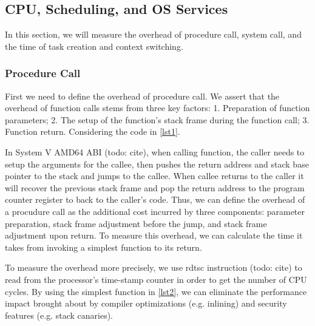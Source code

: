 \subsection{CPU, Scheduling, and OS Services}
In this section, we will measure the overhead of procedure call, system call, and the time of task creation and context switching.

\subsubsection{Procedure Call}
First we need to define the overhead of procedure call. We assert that the overhead of function calls stems from three key factors: 1. Preparation of function parameters; 2. The setup of the function's stack frame during the function call; 3. Function return. Considering the code in \ref{lst1}. 

In System V AMD64 ABI (todo: cite), when calling function, the caller needs to setup the arguments for the callee, then pushes the return address and stack base pointer to the stack and jumps to the callee. When callee returns to the caller it will recover the previous stack frame and pop the return address to the program counter register to back to the caller's code. Thus, we can define the overhead of a procudure call as the additional cost incurred by three components: parameter preparation, stack frame adjustment before the jump, and stack frame adjustment upon return. To measure this overhead, we can calculate the time it takes from invoking a simplest function to its return.

To measure the overhead more precisely, we use rdtsc instruction (todo: cite) to read from the processor’s time-stamp counter in order to get the number of CPU cycles. By using the simplest function in \ref{lst2}, we can eliminate the performance impact brought about by compiler optimizations (e.g. inlining) and security features (e.g. stack canaries).